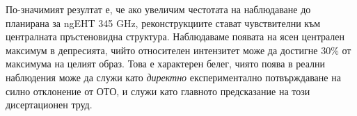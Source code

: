 По-значимият резултат е, че ако увеличим честотата на наблюдаване до планирана за ngEHT 345 GHz, реконструкциите стават чувствителни към централната пръстеновидна структура. Наблюдаваме появата на ясен централен максимум в депресията, чийто относителен интензитет може да достигне 30\% от максимума на целият образ. Това е характерен белег, чиято поява в реални наблюдения може да служи като \emph{директно} експериментално потвърждаване на силно отклонение от ОТО, и служи като главното предсказание на този дисертационен труд.